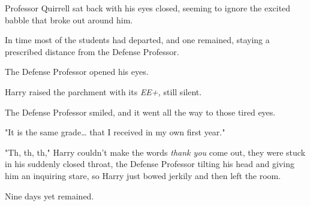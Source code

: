 Professor Quirrell sat back with his eyes closed, seeming to ignore the excited 
babble that broke out around him.

In time most of the students had departed, and one remained, staying a 
prescribed distance from the Defense Professor.

The Defense Professor opened his eyes.

Harry raised the parchment with its \emph{EE+,} still silent.

The Defense Professor smiled, and it went all the way to those tired eyes.

"It is the same grade{\ldots} that I received in my own first year."

"Th, th, th," Harry couldn't make the words \emph{thank you} come out, they 
were stuck in his suddenly closed throat, the Defense Professor tilting his 
head and giving him an inquiring stare, so Harry just bowed jerkily and then 
left the room.

Nine days yet remained.
